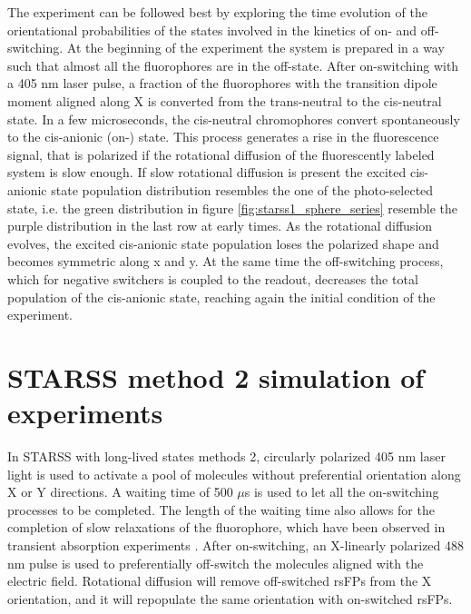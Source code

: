 \documentclass{article}
\begin{document}
The experiment can be followed best by exploring the time evolution of the orientational probabilities of the states involved in the kinetics of on- and off-switching. At the beginning of the experiment the system is prepared in a way such that almost all the fluorophores are in the off-state. After on-switching with a 405 nm laser pulse, a fraction of the fluorophores with the transition dipole moment aligned along X is converted from the trans-neutral to the cis-neutral state. In a few microseconds, the cis-neutral chromophores convert spontaneously to the cis-anionic (on-) state. This process generates a rise in the fluorescence signal, that is polarized if the rotational diffusion of the fluorescently labeled system is slow enough. If slow rotational diffusion is present the excited cis-anionic state population distribution resembles the one of the photo-selected state, i.e. the green distribution in figure \ref{fig:starss1_sphere_series} resemble the purple distribution in the last row at early times. As the rotational diffusion evolves, the excited cis-anionic state population loses the polarized shape and becomes symmetric along x and y. At the same time the off-switching process, which for negative switchers is coupled to the readout, decreases the total population of the cis-anionic state, reaching again the initial condition of the experiment.
\clearpage


\clearpage
\section{STARSS method 2 simulation of experiments}\label{sec:starss_modality2}
In STARSS with long-lived states methods 2, circularly polarized 405 nm laser light is used to activate a pool of molecules without preferential orientation along X or Y directions. A waiting time of 500 $\mu$s is used to let all the on-switching processes to be completed. The length of the waiting time also allows for the completion of slow relaxations of the fluorophore, which have been observed in transient absorption experiments \cite{Laptenok2018, Woodhouse2020}.
After on-switching, an X-linearly polarized 488 nm pulse is used to preferentially off-switch the molecules aligned with the electric field. Rotational diffusion will remove off-switched rsFPs from the X orientation, and it will repopulate the same orientation with on-switched rsFPs.
\end{document}
